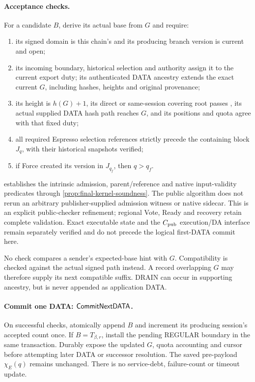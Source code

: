 \paragraph{Acceptance checks.}
For a candidate $B$, derive its actual base from $G$ and require:
\begin{enumerate}[label=(\roman*),itemsep=2pt]
\item its signed domain is this chain's and its producing branch
version is current and open;
\item its incoming boundary, historical selection and authority assign
it to the current export duty; its authenticated DATA ancestry extends
the exact current $G$, including hashes, heights and original provenance;
\item its height is $h(G)+1$, its direct or same-session covering root
passes , its actual supplied DATA hash path reaches
$G$, and its positions and quota agree with that fixed duty;
\item all required Espresso selection references strictly precede
the containing block $J_q$, with their historical snapshots verified;
\item if Force created its version in $J_{q_f}$, then $q>q_f$.
\end{enumerate}
 establishes the intrinsic admission, parent/reference
and native input-validity predicates through
\cref{prop:final-kernel-soundness}. The public algorithm does not rerun an
arbitrary publisher-supplied admission witness or native sidecar. This
is an explicit public-checker refinement; regional Vote, Ready and
recovery retain complete validation. Exact executable state and the
$C_{\rm pub}$ execution/DA interface remain separately verified and do
not precede the logical first-DATA commit here.

No check compares a sender's expected-base hint with $G$. Compatibility
is checked against the actual signed path instead. A record overlapping
$G$ may therefore supply its next compatible suffix. DRAIN can occur in
supporting ancestry, but is never appended as application DATA.

\paragraph{Commit one DATA: $\mathsf{CommitNextDATA}$.}
On successful checks, atomically append $B$ and increment its producing
session's accepted count once. If $B=T_{\beta,r}$, install the pending
REGULAR boundary in the same transaction. Durably expose the updated
$G$, quota accounting and cursor before attempting later DATA or
successor resolution. The saved pre-payload $\chi_E(q)$ remains unchanged.
There is no service-debt, failure-count or timeout update.

